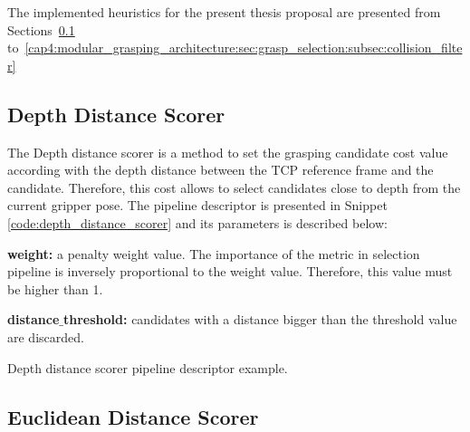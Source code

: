 

The implemented heuristics for the present thesis proposal are presented from Sections~\ref{cap4:modular_grasping_architecture:sec:grasp_selection:subsec:depth_distance} to~\ref{cap4:modular_grasping_architecture:sec:grasp_selection:subsec:collision_filter}

\subsection{Depth Distance Scorer}
\label{cap4:modular_grasping_architecture:sec:grasp_selection:subsec:depth_distance}

The Depth distance scorer is a method to set the grasping candidate cost value according with the depth distance between the TCP  reference frame and the candidate. Therefore, this cost allows to select candidates close to depth from the current gripper pose. The pipeline descriptor is presented in Snippet \ref{code:depth_distance_scorer} and its parameters is described below:

\begin{itemize_jp}
    \item \textbf{weight:} a penalty weight value. The importance of the metric in selection pipeline is inversely proportional to the weight value. Therefore, this value must be higher than 1.
    \item \textbf{distance$\_$threshold:} candidates with a distance bigger than the threshold value are discarded.
\end{itemize_jp}


\begin{snippet}[h!]
\centering
{}
\caption{Depth distance scorer pipeline descriptor example.}
\label{code:depth_distance_scorer}
\end{snippet}

\subsection{Euclidean Distance Scorer}
\label{cap4:modular_grasping_architecture:sec:grasp_selection:subsec:euclidean_distance}

